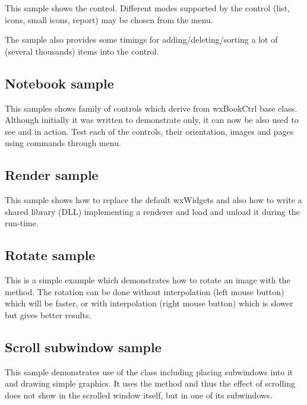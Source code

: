 This sample shows the  control. Different modes
supported by the control (list, icons, small icons, report) may be chosen from
the menu.

The sample also provides some timings for adding/deleting/sorting a lot of
(several thousands) items into the control.



\subsection{Notebook sample}\label{samplenotebook}

This samples shows family of controls which derive from wxBookCtrl base class.
Although initially it was written to demonstrate 
only, it can now be also used to see  and
 in action. Test each of the controls, their
orientation, images and pages using commands through menu.



\subsection{Render sample}\label{samplerender}

This sample shows how to replace the default wxWidgets
 and also how to write a shared library
(DLL) implementing a renderer and load and unload it during the run-time.



\subsection{Rotate sample}\label{samplerotate}

This is a simple example which demonstrates how to rotate an image with
the  method. The rotation can
be done without interpolation (left mouse button) which will be faster,
or with interpolation (right mouse button) which is slower but gives
better results.


\subsection{Scroll subwindow sample}\label{samplescrollsub}

This sample demonstrates use of the 
class including placing subwindows into it and drawing simple graphics. It uses the
 method and thus the effect
of scrolling does not show in the scrolled window itself, but in one of its subwindows.

